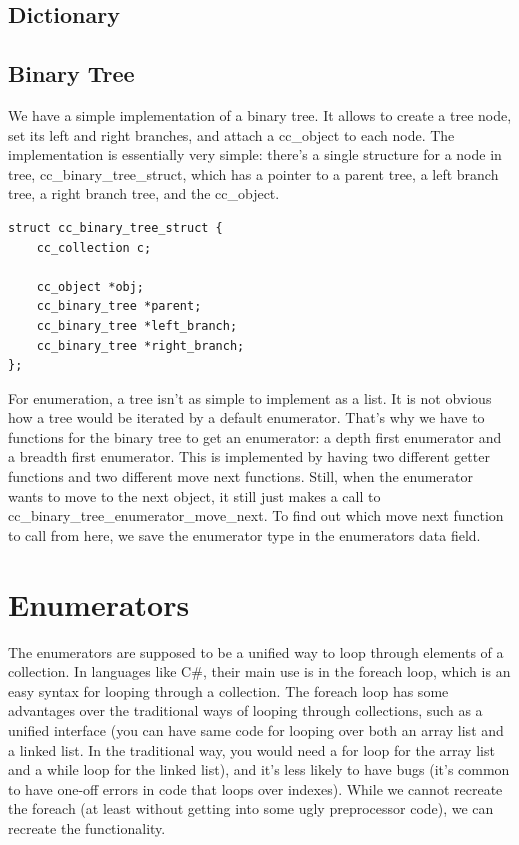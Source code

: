 \documentclass[table]{ituthesis}
\begin{document}
	\subsection{Dictionary}
	\subsection{Binary Tree}
	
  We have a simple implementation of a binary tree. It allows to create a tree node, set its left and right branches, and attach a cc_object to each node. The implementation is essentially very simple: there's a single structure for a node in tree, cc_binary_tree_struct, which has a pointer to a parent tree, a left branch tree, a right branch tree, and the cc_object.
	
\begin{lstlisting}[label=cc_binary_tree-struct,caption=Internal representation of Binary Tree]
struct cc_binary_tree_struct {
	cc_collection c;
	
	cc_object *obj;
	cc_binary_tree *parent;
	cc_binary_tree *left_branch;
	cc_binary_tree *right_branch;
};
\end{lstlisting}

  For enumeration, a tree isn't as simple to implement as a list. It is not obvious how a tree would be iterated by a default enumerator. That's why we have to functions for the binary tree to get an enumerator: a depth first enumerator and a breadth first enumerator. This is implemented by having two different getter functions and two different move next functions. Still, when the enumerator wants to move to the next object, it still just makes a call to cc_binary_tree_enumerator_move_next. To find out which move next function to call from here, we save the enumerator type in the enumerators data field.
	
\section{Enumerators}

	The enumerators are supposed to be a unified way to loop through elements of a collection. In languages like C\#, their main use is in the foreach loop, which is an easy syntax for looping through a collection. The foreach loop has some advantages over the traditional ways of looping through collections, such as a unified interface (you can have same code for looping over both an array list and a linked list. In the traditional way, you would need a for loop for the array list and a while loop for the linked list), and it's less likely to have bugs (it's common to have one-off errors in code that loops over indexes). While we cannot recreate the foreach (at least without getting into some ugly preprocessor code), we can recreate the functionality.
\end{document}

